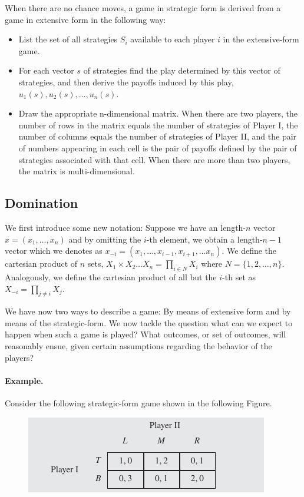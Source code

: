When there are no chance moves, a game in strategic form is derived from a game in extensive form in the following way:

\begin{itemize}
	\item List the set of all strategies $S_i$ available to each player $i$ in the extensive-form game.
	\item For each vector $s$ of strategies find the play determined by this vector of strategies, and then derive the payoffs induced by this play, $u_1(s), u_2(s), \ldots, u_n(s)$.
	\item Draw the appropriate n-dimensional matrix. When there are two players, the number of rows in the matrix equals the number of strategies of Player I, the number of columns equals the number of strategies of Player II, and the pair of numbers appearing in each cell is the pair of payoffs defined by the pair of strategies associated with that cell. When there are more than two players, the matrix is multi-dimensional.
\end{itemize}

\subsection{Domination}

We first introduce some new notation: Suppose we have an length-$n$ vector $x = (x_1, \ldots, x_n)$ and by omitting the $i$-th element, we obtain a length-$n-1$ vector which we denotes as $x_{-i} = (x_1, \ldots, x_{i-1}, x_{i+1}, \ldots x_n)$. We define the cartesian product of $n$ sets, $X_1 \times X_2 \ldots X_n = \prod_{i \in N} X_i$ where $N = \{1,2, \ldots, n\}$. Analogously, we define the cartesian product of all but the $i$-th set as $X_{- i} = \prod_{j \neq i} X_j$.

We have now two ways to describe a game: By means of extensive form and by means of the strategic-form. We now tackle the question what can we expect to happen when such a game is played? What outcomes, or set of outcomes, will reasonably ensue, given certain assumptions regarding the behavior of the players?

\paragraph{Example.} Consider the following strategic-form game shown in the following Figure.

\begin{figure}[H]
    \centering
    \includegraphics[scale=0.75]{images/2023-10-10-game_theory_10.png}
\end{figure}

